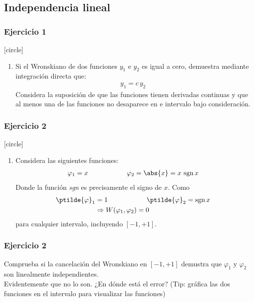 \subsection{Independencia lineal}
\begin{frame}
\frametitle{Ejercicio 1}
[circle]
\begin{enumerate}
\item Si el Wronskiano de dos funciones $y_{1}$ e $y_{2}$ es igual a cero, demuestra mediante integración directa que:
\begin{align*}
y_{1} = c \, y_{2}
\end{align*}
Considera la suposición de que las funciones tienen derivadas continuas y que al menos una de las funciones no desaparece en e intervalo bajo consideración.
\seti
\end{enumerate}
\end{frame}
\begin{frame}
\frametitle{Ejercicio 2}
[circle]
\begin{enumerate}
\conti    
\item Considera las siguientes funciones:
\begin{align*}
\varphi_{1} =  x \hspace{2cm} \varphi_{2} = \abs{x} = x \, \, \mbox{sgn} \, x
\end{align*}
Donde la función \textit{sgn} es precisamente el signo de $x$. Como 
\begin{align*}
\ptilde{\varphi}_{1} &=  1 \hspace{2cm} \ptilde{\varphi}_{2} = \mbox{sgn} \, x \\
&\Rightarrow W(\varphi_{1}, \varphi_{2}) = 0
\end{align*}
para cualquier intervalo, incluyendo $[-1, +1]$.
\seti
\end{enumerate}
\end{frame}
\begin{frame}
\frametitle{Ejercicio 2}
Comprueba si la cancelación del Wronskiano en $[-1, +1]$ demustra que $\varphi_{1}$ y $\varphi_{2}$ son linealmente independientes.
\\
\bigskip
Evidentemente que no lo son. ¿En dónde está el error? (Tip: gráfica las dos funciones en el intervalo para visualizar las funciones)
\end{frame}

